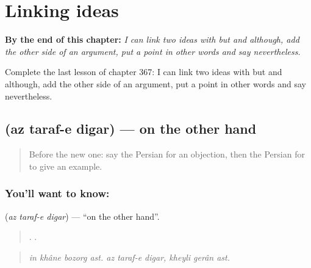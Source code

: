 
\chapter{Linking ideas}
\label{ch:fa-linking-ideas}

\begin{chapteropening}
\textbf{By the end of this chapter:} \emph{I can link two ideas with but and although, add the other side of an argument, put a point in other words and say nevertheless.}

Complete the last lesson of chapter 367: I can link two ideas with but and although, add the other side of an argument, put a point in other words and say nevertheless.
\end{chapteropening}

\section[\texorpdfstring{\fa{از} \fa{طرف} \fa{دیگر} (az taraf-e digar)}{از طرف دیگر (az taraf-e digar)}]{   (az taraf-e digar) — on the other hand}

\label{lesson:FA-C367-az-taraf-e-digar}



\begin{quote}
Before the new one: say the Persian for an objection, then the Persian for to give an example.
\end{quote}

\subsection*{You'll want to know:   }
\textbf{  } (\emph{az taraf-e digar}) — \textquotedblleft{}on the other hand\textquotedblright{}.

\begin{quote}
   .      .
\end{quote}

\begin{quote}
\emph{in khâne bozorg ast. az taraf-e digar, kheyli gerân ast.}
\end{quote}

